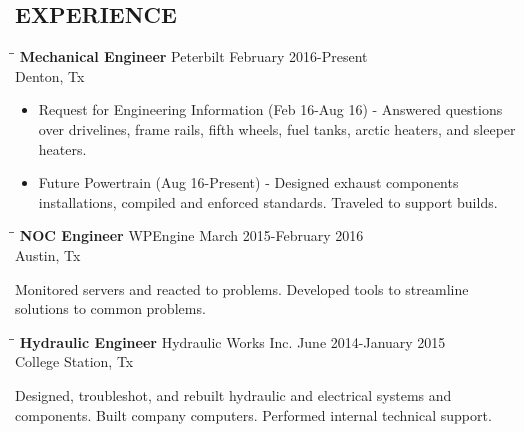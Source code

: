 \documentclass{res}
\begin{document}
\begin{resume}
\section{EXPERIENCE}
   \vspace{-0.1in}	
   \begin{tabbing}
   \hspace{2.5in}\= \hspace{2.6in}\= \kill %
   {\bf Mechanical Engineer} \>Peterbilt     \>February 2016-Present\\
    \>Denton, Tx
   \end{tabbing}\vspace{-10pt}      %
    \begin{itemize}
        \item Request for Engineering Information (Feb 16-Aug 16) - Answered questions over drivelines, frame rails, fifth wheels, fuel tanks, arctic heaters, and sleeper heaters.\\ \vspace{-15pt}
        \item Future Powertrain (Aug 16-Present) - Designed exhaust components installations, compiled and enforced standards. Traveled to support builds. %
    \end{itemize}

   \begin{tabbing}
   \hspace{2.5in}\= \hspace{2.6in}\= \kill %
   {\bf NOC Engineer} \>WPEngine     \>March 2015-February 2016\\
    \>Austin, Tx
   \end{tabbing}\vspace{-20pt}      %
   Monitored servers and reacted to problems. Developed tools to streamline solutions to common problems. 

  \begin{tabbing}
   \hspace{2.5in}\= \hspace{2.6in}\= \kill %
    {\bf Hydraulic Engineer} \>Hydraulic Works Inc.     \>June 2014-January 2015\\
    \>College Station, Tx
   \end{tabbing}\vspace{-20pt}      %
   Designed, troubleshot, and rebuilt hydraulic and electrical systems and components. Built company computers. Performed internal technical support.


\end{resume}
\end{document}
